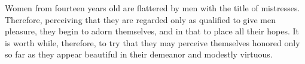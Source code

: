 Women from fourteen years old are flattered by men with the title of
mistresses. Therefore, perceiving that they are regarded only as
qualified to give men pleasure, they begin to adorn themselves, and in
that to place all their hopes. It is worth while, therefore, to try that
they may perceive themselves honored only so far as they appear beautiful
in their demeanor and modestly virtuous.
